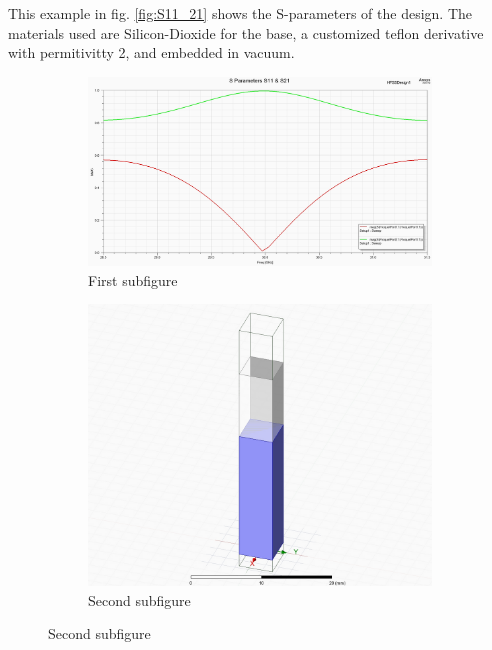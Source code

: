 \documentclass[12pt]{article}
\begin{document}
This example in fig. \ref{fig:S11_21} shows the S-parameters of the design. The materials used are Silicon-Dioxide for the base, a customized teflon derivative with permitivitty 2, and embedded in vacuum.



\begin{figure}[ht]
\centering
\begin{subfigure}[b]{0.45\textwidth}
  \centering
  \includegraphics[width=\textwidth]{./images/Go1_5-9_final.png}
  \caption{First subfigure}
  \label{fig:sub1}
\end{subfigure}
\hfill %
\begin{subfigure}[b]{0.45\textwidth}
  \centering
  \includegraphics[width=\textwidth]{./images/Go1_5-9_model.png}
  \caption{Second subfigure}
  \label{fig:sub2}
\end{subfigure}


\end{figure}
\end{document}
